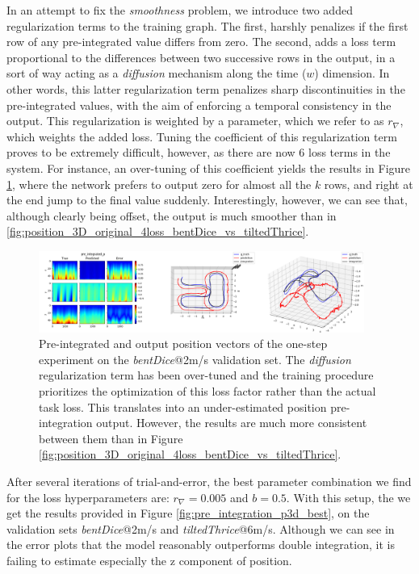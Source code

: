 In an attempt to fix the \emph{smoothness} problem, we introduce two added regularization terms to the training graph.
The first, harshly penalizes if the first row of any pre-integrated value differs from zero.
The second, adds a loss term proportional to the differences between two successive rows in the output, in a sort of way acting as a \emph{diffusion} mechanism along the time ($w$) dimension.
In other words, this latter regularization term penalizes sharp discontinuities in the pre-integrated values, with the aim of enforcing a temporal consistency in the output.
This regularization is weighted by a parameter, which we refer to as $r_\nabla$, which weights the added loss.
Tuning the coefficient of this regularization term proves to be extremely difficult, however, as there are now 6 loss terms in the system.
For instance, an over-tuning of this coefficient yields the results in Figure \ref{fig:position_overtuned_reg_bentDice}, where the network prefers to output zero for almost all the $k$ rows, and right at the end jump to the final value suddenly.
Interestingly, however, we can see that, although clearly being offset, the output is much smoother than in \ref{fig:position_3D_original_4loss_bentDice_vs_tiltedThrice}.

\begin{figure}[h]
   \centering
   \includegraphics[width=0.95\textwidth]{thesis_template/img/pre_integrated_p_overtuned_results.jpg}
   \caption{Pre-integrated and output position vectors of the one-step experiment on the \emph{bentDice}@2m/s validation set. The \emph{diffusion} regularization term has been over-tuned and the training procedure prioritizes the optimization of this loss factor rather than the actual task loss. 
   This translates into an under-estimated position pre-integration output. 
   However, the results are much more consistent between them than in Figure \ref{fig:position_3D_original_4loss_bentDice_vs_tiltedThrice}.}
   \label{fig:position_overtuned_reg_bentDice}
\end{figure}

After several iterations of trial-and-error, the best parameter combination we find for the loss hyperparameters are: $r_\nabla=0.005$ and $b=0.5$.
With this setup, the we get the results provided in Figure \ref{fig:pre_integration_p3d_best}, on the validation sets \emph{bentDice}@2m/s and \emph{tiltedThrice}@6m/s.
Although we can see in the error plots that the model reasonably outperforms double integration, it is failing to estimate especially the z component of position. 


